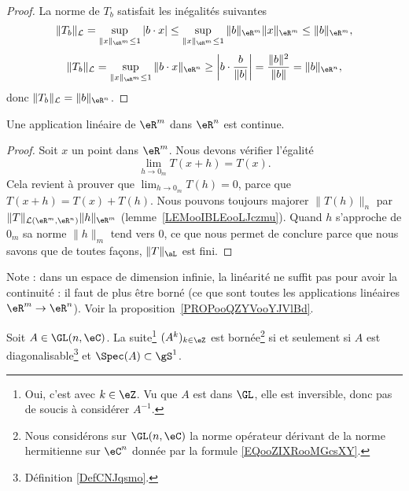 \begin{proof}
	La norme de \( T_b\) satisfait les inégalités suivantes
	\[
		\|T_b\|_{\mathcal{L}}=\sup_{\|x\|_{\eR^m}\leq 1}|b\cdot x|\leq \sup_{\|x\|_{\eR^m}\leq 1}\|b \|_{\eR^m}\|x\|_{\eR^m}\leq\|b \|_{\eR^m},
	\]
	\[
		\|T_b\|_{\mathcal{L}}=\sup_{\|x\|_{\eR^m}\leq 1}\|b\cdot x\|_{\eR^n}\geq \left|b\cdot \frac{b}{\|b |}\right|=\frac{ \| b \|^2 }{ \| b \| }=\|b \|_{\eR^n},
	\]
	donc \( \|T_b\|_{\mathcal{L}}=\|b \|_{\eR^n}\).
\end{proof}

\begin{proposition}
	Une application linéaire de \( \eR^m\) dans \( \eR^n\) est continue.
\end{proposition}

\begin{proof}
	Soit \( x\) un point dans \( \eR^m\). Nous devons vérifier l'égalité
	\begin{equation}
		\lim_{h\to 0_m}T(x+h)=T(x).
	\end{equation}
	Cela revient à prouver que \( \lim_{h\to 0_m}T(h)=0\), parce que \( T(x+h)=T(x)+T(h)\). Nous pouvons toujours majorer \( \|T(h)\|_n\) par \( \|T\|_{\mathcal{L}(\eR^m,\eR^n)}\| h \|_{\eR^m}\) (lemme~\ref{LEMooIBLEooLJczmu}). Quand \( h\) s'approche de \(  0_m \) sa norme \( \|h\|_m\) tend vers \( 0\), ce que nous permet de conclure parce que nous savons que de toutes façons, \( \| T \|_{\aL}\) est fini.
\end{proof}

Note : dans un espace de dimension infinie, la linéarité ne suffit pas pour avoir la continuité : il faut de plus être borné (ce que sont toutes les applications linéaires \( \eR^m\to\eR^n\)). Voir la proposition~\ref{PROPooQZYVooYJVlBd}.

\begin{proposition}            \label{PROPooHXJAooGaDtme}
	Soit \( A\in\GL(n,\eC)\). La suite\footnote{Oui, c'est avec \( k\in \eZ\). Vu que \( A\) est dans \( \GL\), elle est inversible, donc pas de soucis à considérer \( A^{-1}\).} \( (A^k)_{k\in \eZ}\) est bornée\footnote{Nous considérons sur \( \GL(n,\eC)\) la norme opérateur dérivant de la norme hermitienne sur \( \eC^n\) donnée par la formule \eqref{EQooZIXRooMGcsXY}.} si et seulement si \( A\) est diagonalisable\footnote{Définition \ref{DefCNJqsmo}.} et \( \Spec(A)\subset \gS^1\).
\end{proposition}

